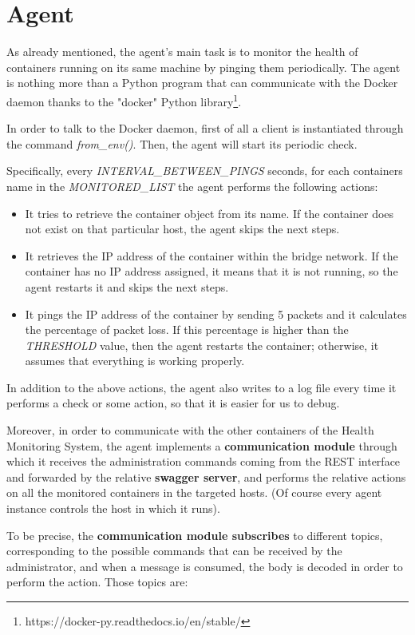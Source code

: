 \section{Agent}
As already mentioned, the agent’s main task is to monitor the health of containers running on its same machine by pinging them periodically. The agent is nothing more than a Python program that can communicate with the Docker daemon thanks to the "docker" Python library\footnote{https://docker-py.readthedocs.io/en/stable/ }.

In order to talk to the Docker daemon, first of all a client is instantiated through the command \textit{from\_env()}. Then, the agent will start its periodic check.

Specifically, every \textit{INTERVAL\_BETWEEN\_PINGS} seconds, for each containers name in the \textit{MONITORED\_LIST} the agent performs the following actions:

\begin{itemize}
	\item It tries to retrieve the container object from its name. If the container does not exist on that particular host, the agent skips the next steps.
	\item It retrieves the IP address of the container within the bridge network. If the container has no IP address assigned, it means that it is not running, so the agent restarts it and skips the next steps.
	\item It pings the IP address of the container by sending 5 packets and it calculates the percentage of packet loss. If this percentage is higher than the \textit{THRESHOLD} value, then the agent restarts the container; otherwise, it assumes that everything is working properly.
\end{itemize}
In addition to the above actions, the agent also writes to a log file every time it performs a check or some action, so that it is easier for us to debug.

Moreover, in order to communicate with the other containers of the Health Monitoring System, the agent implements a \textbf{communication module} through which it receives the administration commands coming from the REST interface and forwarded by the relative \textbf{swagger server}, and performs the relative actions on all the monitored containers in the targeted hosts. (Of course every agent instance controls the host in which it runs).

To be precise, the \textbf{communication module subscribes} to different topics, corresponding to the possible commands that can be received by the administrator, and when a message is consumed, the body is decoded in order to perform the action. Those topics are:

